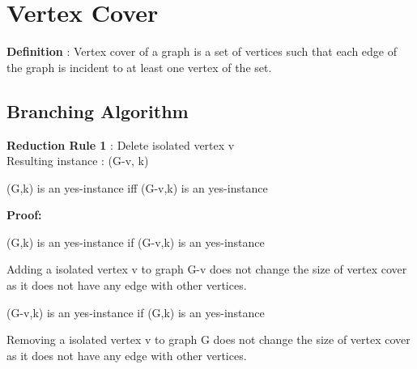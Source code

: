 \hspace{3mm}

\chapter{Vertex Cover}

\textbf{Definition} : Vertex cover of a graph is a set of vertices 
such that each edge of the graph is incident to at least one vertex of the set.

\vspace{-0.8cm}
\section{Branching Algorithm}

\vspace{0.6cm}

\textbf{Reduction Rule 1} : Delete isolated vertex v \\
Resulting instance : (G-v, k) 

\begin{theorem}
       (G,k) is an yes-instance iff (G-v,k) is an yes-instance  
\end{theorem}

\textbf{Proof:}

\hfill \vspace{-1.5cm}
      \begin{center}
              (G,k) is an yes-instance if (G-v,k) is an yes-instance 
       \end{center} \vspace{-0.2cm}
Adding a isolated vertex v to graph G-v does not change the size of vertex cover as 
it does not have any edge with other vertices.
\newpage
       \begin{center}
              (G-v,k) is an yes-instance if (G,k) is an yes-instance               
       \end{center}
Removing a isolated vertex v to graph G does not change the size of vertex cover as 
it does not have any edge with other vertices.

